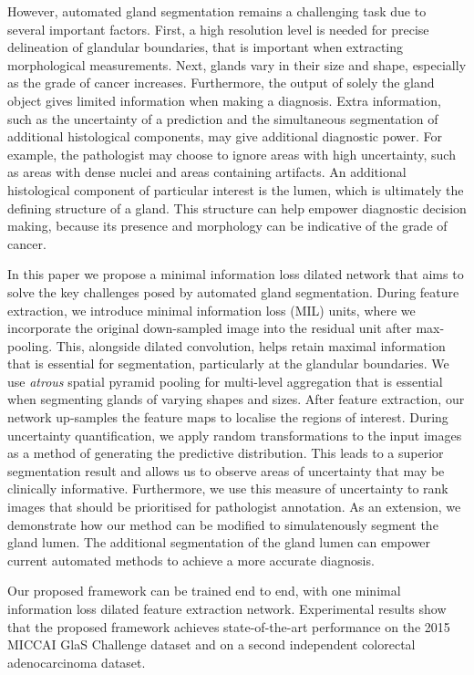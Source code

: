 \documentclass[3p]{elsarticle}
\begin{document}
However, automated gland segmentation remains a challenging task due to several important factors. First, a high resolution level is needed for precise delineation of glandular boundaries, that is important when extracting morphological measurements.  Next, glands vary in their size and shape, especially as the grade of cancer increases. Furthermore, the output of solely the gland object gives limited information when making a diagnosis. Extra information, such as the uncertainty of a prediction and the simultaneous segmentation of additional histological components, may give additional diagnostic power. For example, the pathologist may choose to ignore areas with high uncertainty, such as areas with dense nuclei and areas containing artifacts. An additional histological component of particular interest is the lumen, which is ultimately the defining structure of a gland. This structure can help empower diagnostic decision making, because its presence and morphology can be indicative of the grade of cancer.

In this paper we propose a minimal information loss dilated network that aims to solve the key challenges posed by automated gland segmentation. During feature extraction, we introduce minimal information loss (MIL) units, where we incorporate the original down-sampled image into the residual unit after max-pooling. This, alongside dilated convolution, helps retain maximal information that is essential for segmentation, particularly at the glandular boundaries. We use \textit{atrous} spatial pyramid pooling for multi-level aggregation that is essential when segmenting glands of varying shapes and sizes. After feature extraction, our network up-samples the feature maps to localise the regions of interest. During uncertainty quantification, we apply random transformations to the input images as a method of generating the predictive distribution. This leads to a superior segmentation result and allows us to observe areas of uncertainty that may be clinically informative. Furthermore, we use this measure of uncertainty to rank images that should be prioritised for pathologist annotation. As an extension, we demonstrate how our method can be modified to simulatenously segment the gland lumen. The additional segmentation of the gland lumen can empower current automated methods to achieve a more accurate diagnosis. 

Our proposed framework can be trained end to end, with one minimal information loss dilated feature extraction network. Experimental results show that the proposed framework achieves state-of-the-art performance on the 2015 MICCAI GlaS Challenge dataset and on a second independent colorectal adenocarcinoma dataset.
\end{document}

